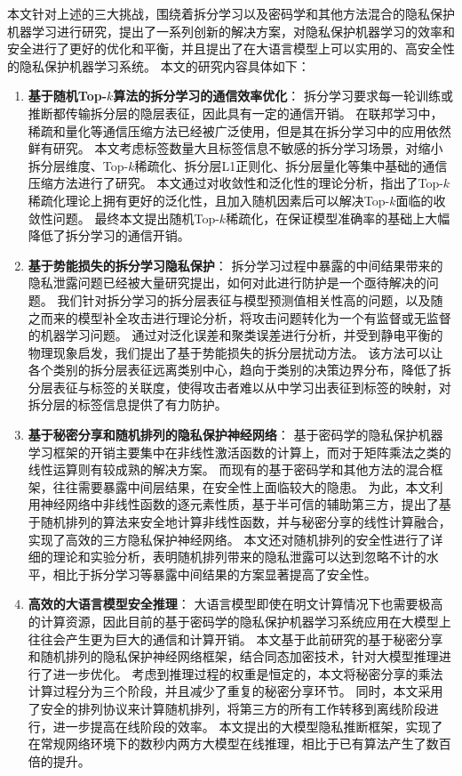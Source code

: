 本文针对上述的三大挑战，围绕着拆分学习以及密码学和其他方法混合的隐私保护机器学习进行研究，提出了一系列创新的解决方案，对隐私保护机器学习的效率和安全进行了更好的优化和平衡，并且提出了在大语言模型上可以实用的、高安全性的隐私保护机器学习系统。
%
本文的研究内容具体如下：
%
\begin{enumerate}[label={(\arabic*)}]
    \item \textbf{基于随机Top-$k$算法的拆分学习的通信效率优化}：
    拆分学习要求每一轮训练或推断都传输拆分层的隐层表征，因此具有一定的通信开销。
    在联邦学习中，稀疏和量化等通信压缩方法已经被广泛使用，但是其在拆分学习中的应用依然鲜有研究。
    本文考虑标签数量大且标签信息不敏感的拆分学习场景，对缩小拆分层维度、Top-$k$稀疏化、拆分层L1正则化、拆分层量化等集中基础的通信压缩方法进行了研究。
    本文通过对收敛性和泛化性的理论分析，指出了Top-$k$稀疏化理论上拥有更好的泛化性，且加入随机因素后可以解决Top-$k$面临的收敛性问题。
    最终本文提出随机Top-$k$稀疏化，在保证模型准确率的基础上大幅降低了拆分学习的通信开销。
    
    \item \textbf{基于势能损失的拆分学习隐私保护}：
    拆分学习过程中暴露的中间结果带来的隐私泄露问题已经被大量研究提出，如何对此进行防护是一个亟待解决的问题。
    我们针对拆分学习的拆分层表征与模型预测值相关性高的问题，以及随之而来的模型补全攻击进行理论分析，将攻击问题转化为一个有监督或无监督的机器学习问题。
    通过对泛化误差和聚类误差进行分析，并受到静电平衡的物理现象启发，我们提出了基于势能损失的拆分层扰动方法。
    该方法可以让各个类别的拆分层表征远离类别中心，趋向于类别的决策边界分布，降低了拆分层表征与标签的关联度，使得攻击者难以从中学习出表征到标签的映射，对拆分层的标签信息提供了有力防护。

    \item \textbf{基于秘密分享和随机排列的隐私保护神经网络}：
    基于密码学的隐私保护机器学习框架的开销主要集中在非线性激活函数的计算上，而对于矩阵乘法之类的线性运算则有较成熟的解决方案。
    而现有的基于密码学和其他方法的混合框架，往往需要暴露中间层结果，在安全性上面临较大的隐患。
    为此，本文利用神经网络中非线性函数的逐元素性质，基于半可信的辅助第三方，提出了基于随机排列的算法来安全地计算非线性函数，并与秘密分享的线性计算融合，实现了高效的三方隐私保护神经网络。
    本文还对随机排列的安全性进行了详细的理论和实验分析，表明随机排列带来的隐私泄露可以达到忽略不计的水平，相比于拆分学习等暴露中间结果的方案显著提高了安全性。
 
    \item \textbf{高效的大语言模型安全推理}：
    大语言模型即使在明文计算情况下也需要极高的计算资源，因此目前的基于密码学的隐私保护机器学习系统应用在大模型上往往会产生更为巨大的通信和计算开销。
    本文基于此前研究的基于秘密分享和随机排列的隐私保护神经网络框架，结合同态加密技术，针对大模型推理进行了进一步优化。
    考虑到推理过程的权重是恒定的，本文将秘密分享的乘法计算过程分为三个阶段，并且减少了重复的秘密分享环节。
    同时，本文采用了安全的排列协议来计算随机排列，将第三方的所有工作转移到离线阶段进行，进一步提高在线阶段的效率。
    本文提出的大模型隐私推断框架，实现了在常规网络环境下的数秒内两方大模型在线推理，相比于已有算法产生了数百倍的提升。
\end{enumerate}